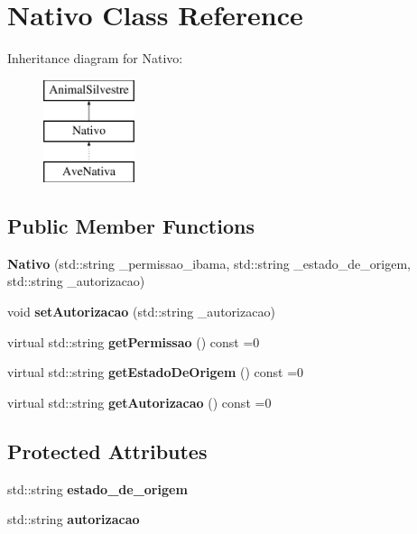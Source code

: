 \hypertarget{classNativo}{}\section{Nativo Class Reference}
\label{classNativo}
Inheritance diagram for Nativo\+:\begin{figure}[H]
\begin{center}
\leavevmode
\includegraphics[height=3.000000cm]{classNativo}
\end{center}
\end{figure}
\subsection*{Public Member Functions}
\begin{DoxyCompactItemize}
\item 
\mbox{\label{classNativo_af8d9129aa83fdb5fc4956167f13ce251}} 
{\bfseries Nativo} (std\+::string \+\_\+permissao\+\_\+ibama, std\+::string \+\_\+estado\+\_\+de\+\_\+origem, std\+::string \+\_\+autorizacao)
\item 
\mbox{\label{classNativo_af97564a1f971167fdc5d8676e9bcb649}} 
void {\bfseries set\+Autorizacao} (std\+::string \+\_\+autorizacao)
\item 
\mbox{\label{classNativo_aff24d9940ac1f8310b55ce1c2b14df98}} 
virtual std\+::string {\bfseries get\+Permissao} () const =0
\item 
\mbox{\label{classNativo_a83f2b4924bc193ae56637ff5db9627c5}} 
virtual std\+::string {\bfseries get\+Estado\+De\+Origem} () const =0
\item 
\mbox{\label{classNativo_a1518e3beaa33ebd30c318e305961fb2d}} 
virtual std\+::string {\bfseries get\+Autorizacao} () const =0
\end{DoxyCompactItemize}
\subsection*{Protected Attributes}
\begin{DoxyCompactItemize}
\item 
\mbox{\label{classNativo_a7febbf72b864b4b3c348688d21cc74c2}} 
std\+::string {\bfseries estado\+\_\+de\+\_\+origem}
\item 
\mbox{\label{classNativo_a6b1f34afe061f326edd205474b5ae0da}} 
std\+::string {\bfseries autorizacao}
\end{DoxyCompactItemize}


